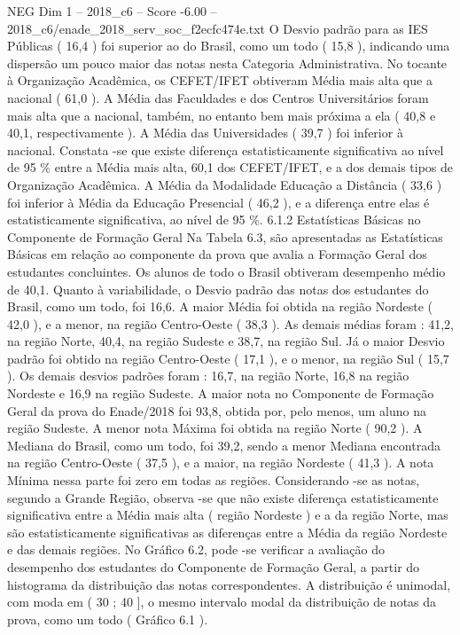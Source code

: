 \begin{textsample}{NEG Dim 1 – 2018\_c6 – Score -6.00 – 2018\_c6/enade\_2018\_serv\_soc\_f2ecfc474e.txt}
O Desvio padrão para as IES Públicas ( 16,4 ) foi superior ao do Brasil, como um todo ( 15,8 ), indicando uma dispersão um pouco maior das notas nesta Categoria Administrativa.
No tocante à Organização Acadêmica, os CEFET/IFET obtiveram Média mais alta que a nacional ( 61,0 ).
A Média das Faculdades e dos Centros Universitários foram mais alta que a nacional, também, no entanto bem mais próxima a ela ( 40,8 e 40,1, respectivamente ).
A Média das Universidades ( 39,7 ) foi inferior à nacional.
Constata -se que existe diferença estatisticamente significativa ao nível de 95 \% entre a Média mais alta, 60,1 dos CEFET/IFET, e a dos demais tipos de Organização Acadêmica.
A Média da Modalidade Educação a Distância ( 33,6 ) foi inferior à Média da Educação Presencial ( 46,2 ), e a diferença entre elas é estatisticamente significativa, ao nível de 95 \%. 6.1.2 Estatísticas Básicas no Componente de Formação Geral Na Tabela 6.3, são apresentadas as Estatísticas Básicas em relação ao componente da prova que avalia a Formação Geral dos estudantes concluintes.
Os alunos de todo o Brasil obtiveram desempenho médio de 40,1.
Quanto à variabilidade, o Desvio padrão das notas dos estudantes do Brasil, como um todo, foi 16,6.
A maior Média foi obtida na região Nordeste ( 42,0 ), e a menor, na região Centro-Oeste ( 38,3 ).
As demais médias foram : 41,2, na região Norte, 40,4, na região Sudeste e 38,7, na região Sul.
Já o maior Desvio padrão foi obtido na região Centro-Oeste ( 17,1 ), e o menor, na região Sul ( 15,7 ).
Os demais desvios padrões foram : 16,7, na região Norte, 16,8 na região Nordeste e 16,9 na região Sudeste.
A maior nota no Componente de Formação Geral da prova do Enade/2018 foi 93,8, obtida por, pelo menos, um aluno na região Sudeste.
A menor nota Máxima foi obtida na região Norte ( 90,2 ).
A Mediana do Brasil, como um todo, foi 39,2, sendo a menor Mediana encontrada na região Centro-Oeste ( 37,5 ), e a maior, na região Nordeste ( 41,3 ).
A nota Mínima nessa parte foi zero em todas as regiões.
Considerando -se as notas, segundo a Grande Região, observa -se que não existe diferença estatisticamente significativa entre a Média mais alta ( região Nordeste ) e a da região Norte, mas são estatisticamente significativas as diferenças entre a Média da região Nordeste e das demais regiões.
No Gráfico 6.2, pode -se verificar a avaliação do desempenho dos estudantes do Componente de Formação Geral, a partir do histograma da distribuição das notas correspondentes.
A distribuição é unimodal, com moda em ( 30 ; 40 ], o mesmo intervalo modal da distribuição de notas da prova, como um todo ( Gráfico 6.1 ).

\end{textsample}
